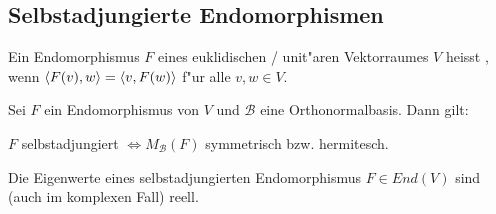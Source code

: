 \documentclass[8pt, a4paper, twocolumn, landscape]{article}
\newcommand{\comment}[1]{}
\begin{document}
\comment{
\begin{lemma}
Zu einem orthogonalen Endomorphismus \(F\) eines endlichdimensionalen euklidischen Vektorraumes \(V\) mit $dim (V) \geq 1\) gibt es immer einen Untervektorraum \(W \subset V\) mit
$
F(W) \subset W \text { und } 1 \leq dim (W) \leq 2 .
$
\end{lemma}
}



\subsection{Selbstadjungierte Endomorphismen}

\comment{
\begin{definition}
Der zu einem Endomorphismus $F$ eines euklidischen / unit"aren Vektorraumes $V$ \bt{adjungierte Endomorphismus} $F^{ad} \in End(V)$ ist definiert durch:
$$
\scp{F(v)}{w} = \scp{v}{F^{ad}(w)}
$$
f"ur alle $v, w \in V$.
\end{definition}


\begin{remark}
Sei $\mathcal{B}$ eine Orthonormalbasis von $V$, $F$ ein Endomorphismus und $A = M_\mathcal{B}(F)$. Dann ist der adjungierte Endormorphismus von $F$ eindeutig gegeben durch $M_\mathcal{B}(F^{ad}) = A^\dagger$.
\end{remark}
}

\begin{definition}
Ein Endomorphismus $F$ eines euklidischen / unit"aren Vektorraumes $V$ heisst , wenn $\left\langle {F(v)} , {w} \right\rangle = \left\langle {v} , {F(w)} \right\rangle$ f"ur alle $v, w \in V$.
\end{definition}

\begin{theorem}
Sei $F$ ein Endomorphismus von \(V\) und \(\mathcal{B}\) eine Orthonormalbasis. Dann gilt: 

\(F\) selbstadjungiert $\Leftrightarrow M_{\mathcal{B}}(F)$ symmetrisch bzw. hermitesch.
\end{theorem}

\begin{lemma}
Die Eigenwerte eines selbstadjungierten Endomorphismus $F \in End(V)$ sind (auch im komplexen Fall) reell. 
\end{lemma}
\end{document}
